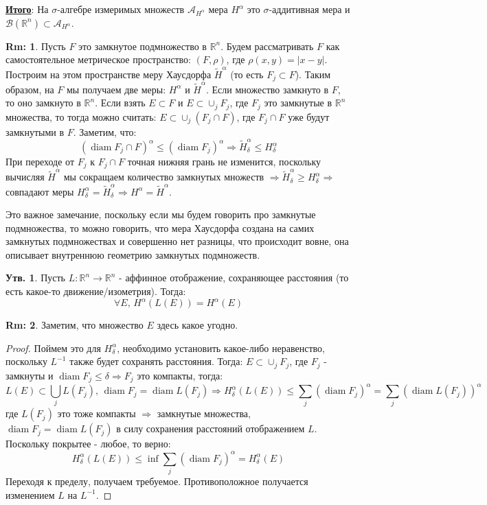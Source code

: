 \documentclass[12pt]{article}
\newcommand{\MR}{\mathbb{R}}
\newcommand{\MA}{\mathcal{A}}
\newcommand{\MB}{\mathcal{B}}
\theoremstyle{definition}
\newtheorem{rem}{Rm:}
\newtheorem{prop}{Утв.}
\DeclareMathOperator{\diam}{\text{diam}}
\newcommand{\ddsum}[2]{\displaystyle\sum\limits_{#1}^{#2}}
\newcommand{\wte}[1]{\widetilde{#1}}
\begin{document}
\textbf{\uline{Итого}}: На $\sigma$-алгебре измеримых множеств $\MA_{H^\alpha}$ мера $H^\alpha$ это $\sigma$-аддитивная мера и $\MB(\MR^n) \subset \MA_{H^\alpha}$.

\begin{rem}
	Пусть $F$ это замкнутое подмножество в $\MR^n$. Будем рассматривать $F$ как самостоятельное метрическое пространство: $(F, \rho)$, где $\rho(x,y) = |x - y|$. Построим на этом пространстве меру Хаусдорфа $\wte{H}^\alpha$ (то есть $F_j \subset F$). Таким образом, на $F$ мы получаем две меры: $H^\alpha$ и $\wte{H}^\alpha$. Если множество замкнуто в $F$, то оно замкнуто в $\MR^n$. Если взять $E \subset F$ и $E \subset \cup_j F_j$, где $F_j$ это замкнутые в $\MR^n$ множества, то тогда можно считать: $E \subset \cup_j (F_j \cap F)$, где $F_j \cap F$ уже будут замкнутыми в $F$. Заметим, что:
	$$
		(\diam{F_j \cap F})^\alpha \leq (\diam{F_j})^\alpha \Rightarrow \wte{H}_\delta^\alpha \leq H_\delta^\alpha
	$$
	При переходе от $F_j$ к $F_j \cap F$ точная нижняя грань не изменится, поскольку вычисляя $\wte{H}^\alpha$ мы сокращаем количество замкнутых множеств $\Rightarrow \wte{H}_\delta^\alpha \geq H_\delta^\alpha \Rightarrow$ совпадают меры $H_\delta^\alpha = \wte{H}_\delta^\alpha \Rightarrow H^\alpha = \wte{H}^\alpha$.
\end{rem}

Это важное замечание, поскольку если мы будем говорить про замкнутые подмножества, то можно говорить, что мера Хаусдорфа создана на самих замкнутых подмножествах и совершенно нет разницы, что происходит вовне, она описывает внутреннюю геометрию замкнутых подмножеств.

\begin{prop}
	Пусть $L \colon \MR^n \to \MR^n$ - аффинное отображение, сохраняющее расстояния (то есть какое-то движение/изометрия). Тогда: 
	$$
		\forall E, \, H^\alpha(L(E)) = H^\alpha(E)
	$$
\end{prop}
\begin{rem}
	Заметим, что множество $E$ здесь какое угодно.
\end{rem}

\begin{proof}
	Поймем это для $H_\delta^\alpha$, необходимо установить какое-либо неравенство, поскольку $L^{-1}$ также будет сохранять расстояния. Тогда: $E \subset \cup_j F_j$, где $F_j$ - замкнуты и $\diam{F_j} \leq \delta \Rightarrow F_j$ это компакты, тогда:
	$$
		L(E) \subset \bigcup\limits_j L(F_j), \, \diam{F_j} = \diam{L(F_j)} \Rightarrow H_\delta^\alpha(L(E)) \leq \ddsum{j}{}(\diam{F_j})^\alpha = \ddsum{j}{}(\diam{L(F_j)})^\alpha
	$$
	где $L(F_j)$ это тоже компакты $\Rightarrow$ замкнутые множества, $\diam{F_j} = \diam{L(F_j)}$ в силу сохранения расстояний отображением $L$. Поскольку покрытее - любое, то верно:
	$$
		H_\delta^\alpha(L(E)) \leq \inf\ddsum{j}{}(\diam{F_j})^\alpha = H_\delta^\alpha(E)
	$$
	Переходя к пределу, получаем требуемое. Противоположное получается изменением $L$ на $L^{-1}$.
\end{proof}
\end{document}
